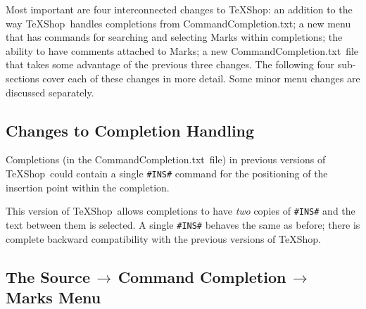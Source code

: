 \documentclass[11pt]{article}
\newcommand{\mnu}[1]{\textsf{#1}}
\newcommand{\To}{\,\(\to\)\,}
\newcommand{\TS}{\textsf{\TeX Shop}}
\newcommand{\CCT}{\textsf{CommandCompletion.txt}}
\begin{document}
Most important are four interconnected changes to \TS: an addition to the way \TS\ handles completions from \CCT; a new menu that has commands for searching and selecting Marks within completions; the ability to have comments attached to Marks; a new \CCT\ file that takes some advantage of the previous three changes. The following four sub-sections cover each of these changes in more detail. Some minor menu changes are discussed separately.

\subsection*{Changes to Completion Handling}

Completions (in the \CCT\ file) in previous versions of \TS\ could contain a single \verb|#INS#| command for the positioning of the insertion point within the completion.

This version of \TS\ allows completions to have \emph{two} copies of \verb|#INS#| and the text between them is selected. A single \verb|#INS#| behaves the same as before; there is complete backward compatibility with the previous versions of \TS.

\subsection*{The \mnu{Source}\To\mnu{Command Completion}\To\mnu{Marks} Menu}
\end{document}
